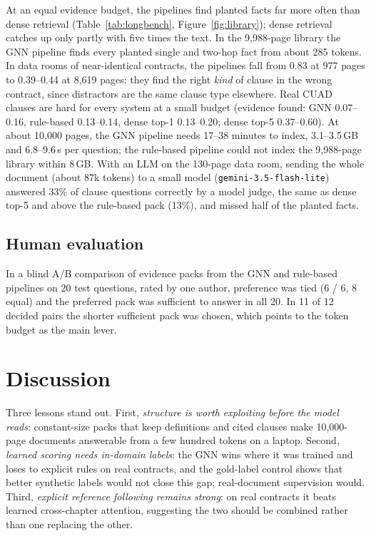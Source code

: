 \documentclass[11pt]{article}
\begin{document}
At an equal evidence budget, the pipelines find planted facts far more often than dense retrieval (Table~\ref{tab:longbench}, Figure~\ref{fig:library}); dense retrieval catches up only partly with five times the text. In the 9,988-page library the GNN pipeline finds every planted single and two-hop fact from about 285 tokens. In data rooms of near-identical contracts, the pipelines fall from 0.83 at 977 pages to 0.39--0.44 at 8,619 pages: they find the right \emph{kind} of clause in the wrong contract, since distractors are the same clause type elsewhere. Real CUAD clauses are hard for every system at a small budget (evidence found: GNN 0.07--0.16, rule-based 0.13--0.14, dense top-1 0.13--0.20; dense top-5 0.37--0.60). At about 10,000 pages, the GNN pipeline needs 17--38 minutes to index, 3.1--3.5\,GB and 6.8--9.6\,s per question; the rule-based pipeline could not index the 9,988-page library within 8\,GB. With an LLM on the 130-page data room, sending the whole document (about 87k tokens) to a small model (\texttt{gemini-3.5-flash-lite}) answered 33\% of clause questions correctly by a model judge, the same as dense top-5 and above the rule-based pack (13\%), and missed half of the planted facts.

\subsection{Human evaluation}
In a blind A/B comparison of evidence packs from the GNN and rule-based pipelines on 20 test questions, rated by one author, preference was tied (6 / 6, 8 equal) and the preferred pack was sufficient to answer in all 20. In 11 of 12 decided pairs the shorter sufficient pack was chosen, which points to the token budget as the main lever.

\section{Discussion}

Three lessons stand out. First, \emph{structure is worth exploiting before the model reads}: constant-size packs that keep definitions and cited clauses make 10,000-page documents answerable from a few hundred tokens on a laptop. Second, \emph{learned scoring needs in-domain labels}: the GNN wins where it was trained and loses to explicit rules on real contracts, and the gold-label control shows that better synthetic labels would not close this gap; real-document supervision would. Third, \emph{explicit reference following remains strong}: on real contracts it beats learned cross-chapter attention, suggesting the two should be combined rather than one replacing the other.
\end{document}
